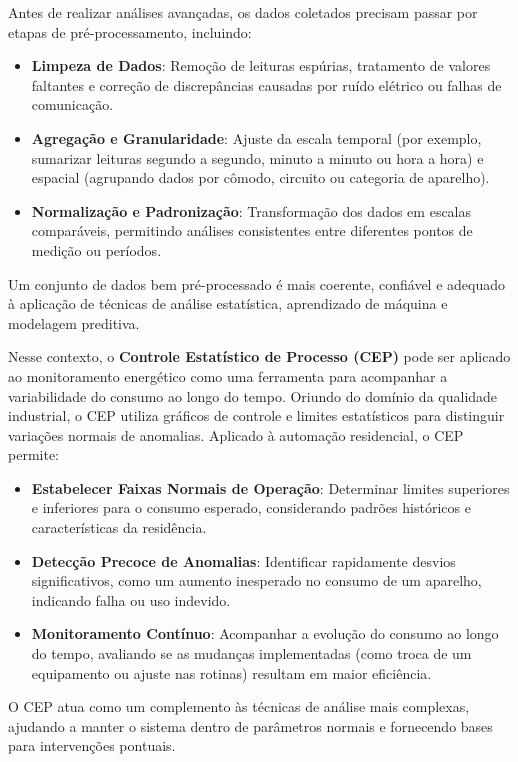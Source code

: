 Antes de realizar análises avançadas, os dados coletados precisam passar por etapas de pré-processamento, incluindo:

\begin{itemize}
    \item \textbf{Limpeza de Dados}: Remoção de leituras espúrias, tratamento de valores faltantes e correção de discrepâncias causadas por ruído elétrico ou falhas de comunicação.
    \item \textbf{Agregação e Granularidade}: Ajuste da escala temporal (por exemplo, sumarizar leituras segundo a segundo, minuto a minuto ou hora a hora) e espacial (agrupando dados por cômodo, circuito ou categoria de aparelho).
    \item \textbf{Normalização e Padronização}: Transformação dos dados em escalas comparáveis, permitindo análises consistentes entre diferentes pontos de medição ou períodos.
\end{itemize}

Um conjunto de dados bem pré-processado é mais coerente, confiável e adequado à aplicação de técnicas de análise estatística, aprendizado de máquina e modelagem preditiva.

Nesse contexto, o \textbf{Controle Estatístico de Processo (CEP)} pode ser aplicado ao monitoramento energético como uma ferramenta para acompanhar a variabilidade do consumo ao longo do tempo. Oriundo do domínio da qualidade industrial, o CEP utiliza gráficos de controle e limites estatísticos para distinguir variações normais de anomalias. Aplicado à automação residencial, o CEP permite:

\begin{itemize}
    \item \textbf{Estabelecer Faixas Normais de Operação}: Determinar limites superiores e inferiores para o consumo esperado, considerando padrões históricos e características da residência.
    \item \textbf{Detecção Precoce de Anomalias}: Identificar rapidamente desvios significativos, como um aumento inesperado no consumo de um aparelho, indicando falha ou uso indevido.
    \item \textbf{Monitoramento Contínuo}: Acompanhar a evolução do consumo ao longo do tempo, avaliando se as mudanças implementadas (como troca de um equipamento ou ajuste nas rotinas) resultam em maior eficiência.
\end{itemize}

O CEP atua como um complemento às técnicas de análise mais complexas, ajudando a manter o sistema dentro de parâmetros normais e fornecendo bases para intervenções pontuais.
